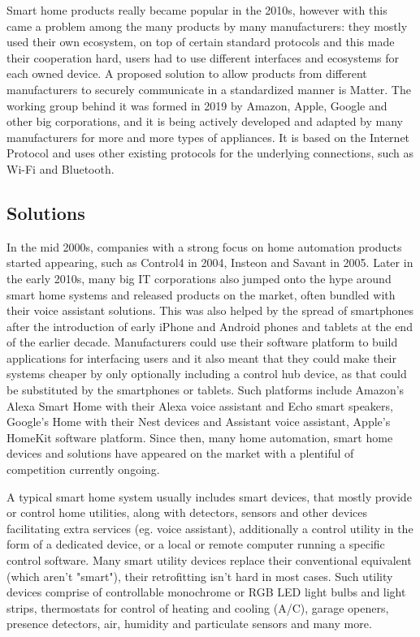 Smart home products really became popular in the 2010s, however with this came a problem among the many products by many manufacturers: they mostly used their own ecosystem, on top of certain standard protocols and this made their cooperation hard, users had to use different interfaces and ecosystems for each owned device. A proposed solution to allow products from different manufacturers to securely communicate in a standardized manner is Matter. \cite{PCMagMatter} The working group behind it was formed in 2019 by Amazon, Apple, Google and other big corporations, and it is being actively developed and adapted by many manufacturers for more and more types of appliances. It is based on the Internet Protocol and uses other existing protocols for the underlying connections, such as Wi-Fi and Bluetooth.

\subsection{Solutions}

In the mid 2000s, companies with a strong focus on home automation products started appearing, such as Control4 in 2004, Insteon and Savant in 2005. \cite{Control4about} \cite{WPInsteonFirstLook} \cite{SavantCompInfo}\break
Later in the early 2010s, many big IT corporations also jumped onto the hype around smart home systems and released products on the market, often bundled with their voice assistant solutions. This was also helped by the spread of smartphones after the introduction of early iPhone and Android phones and tablets at the end of the earlier decade. Manufacturers could use their software platform to build applications for interfacing users and it also meant that they could make their systems cheaper by only optionally including a control hub device, as that could be substituted by the smartphones or tablets. Such platforms include Amazon's Alexa Smart Home with their Alexa voice assistant and Echo smart speakers, Google's Home with their Nest devices and Assistant voice assistant, Apple's HomeKit software platform. \cite{AmazonAlexaSH} \cite{GoogleHome} \cite{GoogleAssistant} \cite{AppleHome} Since then, many home automation, smart home devices and solutions have appeared on the market with a plentiful of competition currently ongoing. \cite{ChakSHS}

A typical smart home system usually includes smart devices, that mostly provide or control home utilities, along with detectors, sensors and other devices facilitating extra services (eg. voice assistant), additionally a control utility in the form of a dedicated device, or a local or remote computer running a specific control software. Many smart utility devices replace their conventional equivalent (which aren't "smart"), their retrofitting isn't hard in most cases. Such utility devices comprise of controllable monochrome or RGB LED light bulbs and light strips, thermostats for control of heating and cooling (A/C), garage openers, presence detectors, air, humidity and particulate sensors and many more. \cite{TechTargetSH}

